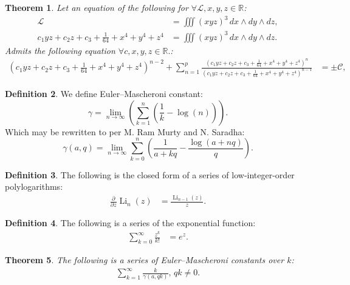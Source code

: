 \documentclass[10pt]{article}
\theoremstyle{plain}
\newtheorem{theorem}{Theorem}[section]
\theoremstyle{definition}
\newtheorem{definition}[theorem]{Definition}
\theoremstyle{remark}
\begin{document}
\begin{theorem}
	Let an equation of the following for $\forall \mathcal{L}, x, y, z \in \mathbb{R}$:
	\begin{align*}
		\mathcal{L} &= \iiint (x y z)^{3} \, dx \land dy \land dz,\\
		c_{1} y z + c_{2} z + c_{3} + \frac{1}{64} + x^{4} + y^{4} + z^{4} &= \iiint (x y z)^{3} \, dx \land dy \land  dz.
	\end{align*}
	Admits the following equation $\forall c, x, y, z \in \mathbb{R}.$:
	\begin{align*}
		(c_{1} y z + c_{2} z + c_{3} + \frac{1}{64} + x^{4} + y^{4} + z^{4})^{n-2} + \sum_{n=1}^{p} \frac{ (c_{1} y z + c_{2} z + c_{3} + \frac{1}{64} + x^{4} + y^{4} + z^{4})^{n}}{ (c_{1} y z + c_{2} z + c_{3} + \frac{1}{64} + x^{4} + y^{4} + z^{4})^{n-1}} &= \pm \mathcal{C},
	\end{align*}
\end{theorem}

\begin{definition}
	We define Euler–Mascheroni constant:
	\begin{equation}
		\gamma = \lim_{n \to \infty}(\sum_{k=1}^{n}(\frac{1}{k}-\log(n))).
	\end{equation}
	Which may be rewritten to per M. Ram Murty and N. Saradha:
	\begin{equation}
		\gamma(a, q) = \lim_{n \to \infty}\sum_{k=0}^{n}(\frac{1}{a+kq}-\frac{\log(a+nq)}{q}).
	\end{equation}
\end{definition}

\begin{definition}
	The following is the closed form of a series of low-integer-order polylogarithms:
	\begin{align*}
		\frac{\partial}{\partial z} \operatorname{Li}_{n}(z) &= \frac{\operatorname{Li}_{n-1}(z)}{z}.
	\end{align*}
\end{definition}

\begin{definition}
	The following is a series of the exponential function:
	\begin{align*}
		\sum_{k=0}^{\infty} \frac{z^k}{k!} &= e^{z}.
	\end{align*}
\end{definition}

\begin{theorem}
	The following is a series of Euler–Mascheroni constants over $k$:
	\begin{align*}
		\sum_{k=1}^{\infty} \frac{k}{\gamma(a, qk)}, \, qk \neq 0.
	\end{align*}
\end{theorem}
\end{document}
